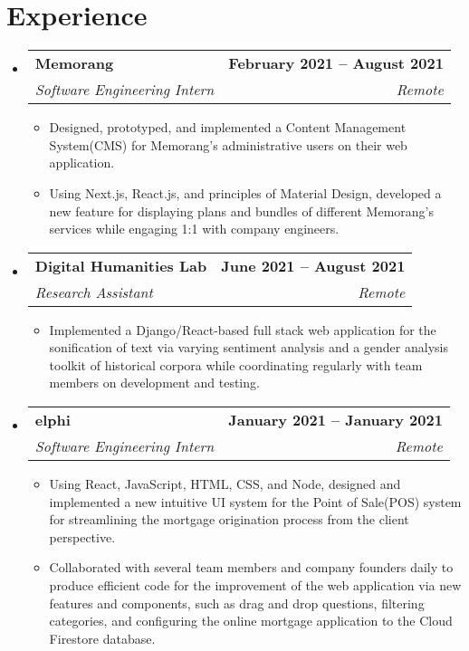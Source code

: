 \documentclass[letterpaper,11pt]{article}
\makeatletter
\newcommand{\resumeItem}[1]{
  \item\small{
    {#1 \vspace{-2pt}}
  }
}
\newcommand{\resumeSubheading}[4]{
  \vspace{-2pt}\item
    \begin{tabular*}{1.0\textwidth}[t]{l@{\extracolsep{\fill}}r}
      \textbf{#1} & \textbf{\small #2} \\
      \textit{\small#3} & \textit{\small #4} \\
    \end{tabular*}\vspace{-7pt}
}
\newcommand{\resumeSubHeadingListStart}{\begin{itemize}[leftmargin=0.0in, label={}]}
\newcommand{\resumeSubHeadingListEnd}{\end{itemize}}
\newcommand{\resumeItemListStart}{\begin{itemize}}
\newcommand{\resumeItemListEnd}{\end{itemize}\vspace{-5pt}}
\makeatother
\begin{document}
\section{Experience}
  \resumeSubHeadingListStart

    \resumeSubheading
      {Memorang}{February 2021 -- August 2021}
      {Software Engineering Intern}{Remote}
      \resumeItemListStart
        \resumeItem{Designed, prototyped, and implemented a Content Management System(CMS) for Memorang's administrative users on their web application.}
        \resumeItem{Using Next.js, React.js, and principles of Material Design, developed a new feature for displaying plans and bundles of different Memorang's services while engaging 1:1 with company engineers.}
      \resumeItemListEnd

    \resumeSubheading
      {Digital Humanities Lab}{June 2021 -- August 2021}
      {Research Assistant}{Remote}
      \resumeItemListStart
        \resumeItem{Implemented a Django/React-based full stack web application for the sonification of text via varying sentiment analysis and a gender analysis toolkit of historical corpora while coordinating regularly with team members on development and testing.}
    \resumeItemListEnd
    
    \resumeSubheading
      {elphi}{January 2021 -- January 2021}
      {Software Engineering Intern}{Remote}
      \resumeItemListStart
        \resumeItem{Using React, JavaScript, HTML, CSS, and Node, designed and implemented a new intuitive UI system for the Point of Sale(POS) system for streamlining the mortgage origination process from the client perspective.}
        \resumeItem{Collaborated with several team members and company founders daily to produce efficient code for the improvement of the web application via new features and components, such as drag and drop questions, filtering categories, and configuring the online mortgage application to the Cloud Firestore database.}
    \resumeItemListEnd
    
  \resumeSubHeadingListEnd
\vspace{-16pt}

\end{document}
